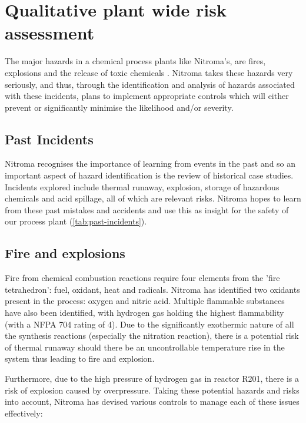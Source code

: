 \section{Qualitative plant wide risk assessment}

The major hazards in a chemical process plants like Nitroma’s, are fires, explosions and the release of toxic chemicals \cite{mannan_lees_2012}. Nitroma takes these hazards very seriously, and thus, through the identification and analysis of hazards associated with these incidents, plans to implement appropriate controls which will either prevent or significantly minimise the likelihood and/or severity. 


\subsection{Past Incidents}

Nitroma recognises the importance of learning from events in the past and so an important aspect of hazard identification is the review of historical case studies. Incidents explored include thermal runaway, explosion, storage of hazardous chemicals and acid spillage, all of which are relevant risks. Nitroma hopes to learn from these past mistakes and accidents and use this as insight for the safety of our process plant (\cref{tab:past-incidents}).


\subsection{Fire and explosions}

Fire from chemical combustion reactions require four elements from the 'fire tetrahedron': fuel, oxidant, heat and radicals. Nitroma has identified two oxidants present in the process: oxygen and nitric acid. Multiple flammable substances have also been identified, with hydrogen gas holding the highest flammability (with a NFPA 704 rating of 4). Due to the significantly exothermic nature of all the synthesis reactions (especially the nitration reaction), there is a potential risk of thermal runaway should there be an uncontrollable temperature rise in the system thus leading to fire and explosion.

Furthermore, due to the high pressure of hydrogen gas in reactor R201, there is a risk of explosion caused by overpressure. Taking these potential hazards and risks into account, Nitroma has devised various controls to manage each of these issues effectively: 


